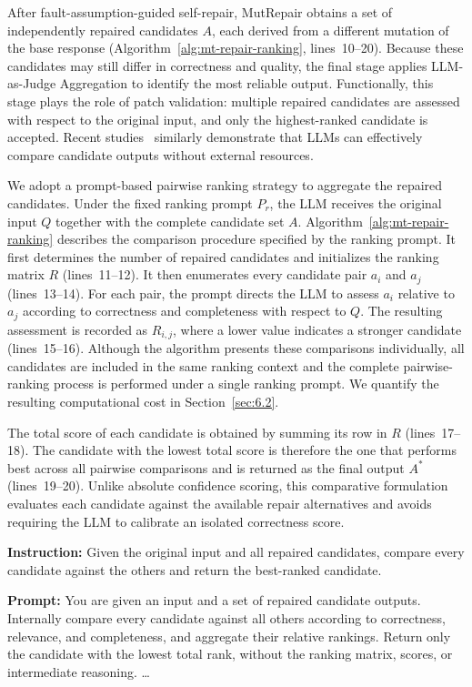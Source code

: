 \documentclass[acmsmall,screen,review,anonymous]{acmart}
\begin{document}
After fault-assumption-guided self-repair, MutRepair obtains a set of independently repaired candidates $A$, each derived from a different mutation of the base response (Algorithm~\ref{alg:mt-repair-ranking}, lines~10--20). Because these candidates may still differ in correctness and quality, the final stage applies LLM-as-Judge Aggregation to identify the most reliable output. Functionally, this stage plays the role of patch validation: multiple repaired candidates are assessed with respect to the original input, and only the highest-ranked candidate is accepted. Recent studies~\cite{li2025generation, zeng2024llm} similarly demonstrate that LLMs can effectively compare candidate outputs without external resources.

We adopt a prompt-based pairwise ranking strategy to aggregate the repaired candidates. Under the fixed ranking prompt $P_r$, the LLM receives the original input $Q$ together with the complete candidate set $A$. Algorithm~\ref{alg:mt-repair-ranking} describes the comparison procedure specified by the ranking prompt. It first determines the number of repaired candidates and initializes the ranking matrix $R$ (lines~11--12). It then enumerates every candidate pair $a_i$ and $a_j$ (lines~13--14). For each pair, the prompt directs the LLM to assess $a_i$ relative to $a_j$ according to correctness and completeness with respect to $Q$. The resulting assessment is recorded as $R_{i,j}$, where a lower value indicates a stronger candidate (lines~15--16). Although the algorithm presents these comparisons individually, all candidates are included in the same ranking context and the complete pairwise-ranking process is performed under a single ranking prompt. We quantify the resulting computational cost in Section~\ref{sec:6.2}.

The total score of each candidate is obtained by summing its row in $R$ (lines~17--18). The candidate with the lowest total score is therefore the one that performs best across all pairwise comparisons and is returned as the final output $A^*$ (lines~19--20). Unlike absolute confidence scoring, this comparative formulation evaluates each candidate against the available repair alternatives and avoids requiring the LLM to calibrate an isolated correctness score.

\begin{tcolorbox}[
    colback=green!6,
    colframe=green!40!black,
    title=Pairwise Ranking Prompt,
    fonttitle=\bfseries,
    fontupper=\small,
    boxrule=0.6pt,
    arc=2pt,
    left=2pt,
    right=2pt,
    top=2pt,
    bottom=2pt
]
\textbf{Instruction:} Given the original input and all repaired candidates, compare every candidate against the others and return the best-ranked candidate.

\textbf{Prompt:} You are given an input and a set of repaired candidate outputs. Internally compare every candidate against all others according to correctness, relevance, and completeness, and aggregate their relative rankings. Return only the candidate with the lowest total rank, without the ranking matrix, scores, or intermediate reasoning. \ldots
\end{tcolorbox}
\end{document}
